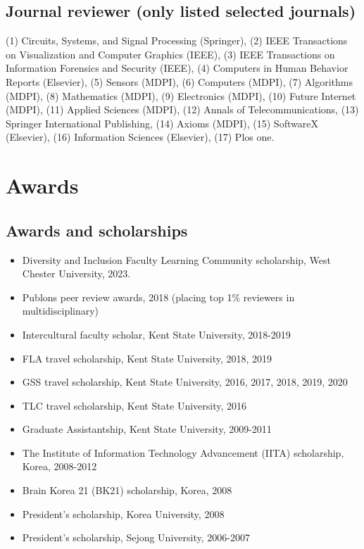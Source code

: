 \documentclass{article}
\begin{document}
\subsection*{Journal reviewer (only listed selected journals)}
\vspace{-0.5em}
\begin{adjustwidth}{1cm}{}
(1) Circuits, Systems, and Signal Processing (Springer), (2) IEEE Transactions on Visualization and Computer Graphics (IEEE), (3) IEEE Transactions on Information Forensics and Security (IEEE), (4) Computers in Human Behavior Reports (Elsevier), (5) Sensors (MDPI), (6) Computers (MDPI), (7) Algorithms (MDPI), (8) Mathematics (MDPI), (9) Electronics (MDPI), (10) Future Internet (MDPI), (11) Applied Sciences (MDPI), (12) Annals of Telecommunications, (13) Springer International Publishing, (14) Axioms (MDPI), (15) SoftwareX (Elsevier), (16) Information Sciences (Elsevier), (17) Plos one.
\end{adjustwidth}

\section*{Awards}
\vspace{-1em}
\subsection*{Awards and scholarships}
\vspace{-0.5em}
\begin{itemize}
 \setlength\itemsep{-0.4em}
    \item Diversity and Inclusion Faculty Learning Community scholarship, West Chester University, 2023.
    \item Publons peer review awards, 2018 (placing top 1\% reviewers in multidisciplinary)
    \item Intercultural faculty scholar, Kent State University, 2018-2019
    \item FLA travel scholarship, Kent State University, 2018, 2019
    \item GSS travel scholarship, Kent State University, 2016, 2017, 2018, 2019, 2020
    \item TLC travel scholarship, Kent State University, 2016
    \item Graduate Assistantship, Kent State University, 2009-2011
    \item The Institute of Information Technology Advancement (IITA) scholarship, Korea, 2008-2012
    \item Brain Korea 21 (BK21) scholarship, Korea, 2008
    \item President’s scholarship, Korea University, 2008
    \item President’s scholarship, Sejong University, 2006-2007 

\end{itemize}
\end{document}
